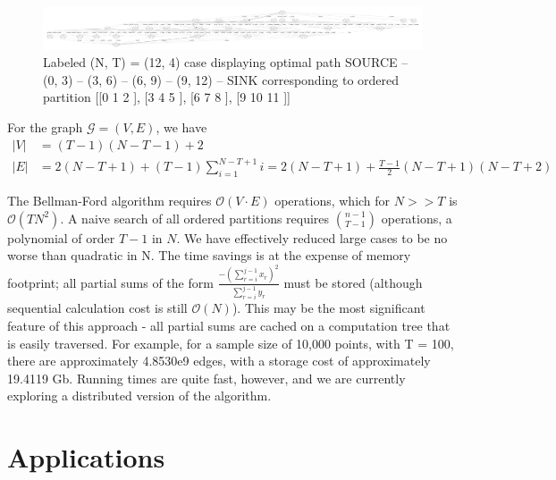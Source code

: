 \documentclass{article}
\theoremstyle{case}
\begin{document}
\vspace{16pt}
\begin{figure}
  \includegraphics[scale=.11]{12_4_labeled.pdf}
  \caption{Labeled (N, T) = (12, 4) case displaying optimal path SOURCE -- (0, 3) -- (3, 6) -- (6, 9) -- (9, 12) --  SINK corresponding to ordered partition [[0 1 2 ], [3 4 5 ], [6 7 8 ], [9 10 11 ]]}
\end{figure}

For the graph $\mathcal{G} = \left( V, E\right)$, we have 
\begin{align*}
\vert V \vert & = \left( T-1\right)\left(N-T-1\right) + 2 \\
\vert E \vert & = 2\left( N-T+1\right) + \left( T-1\right)\sum_{i=1}^{N-T+1} i = 2\left( N-T+1\right) + \frac{T-1}{2}\left( N-T+1\right)\left( N-T+2\right)
\end{align*}

The Bellman-Ford algorithm requires $\mathcal{O}\left( V\cdot E\right)$ operations, which for $N >> T$ is $\mathcal{O}\left( TN^2\right)$. A naive search of all ordered partitions requires $\binom{n-1}{T-1}$ operations, a polynomial of order $T-1$ in $N$. We have effectively reduced large cases to be no worse than quadratic in N. The time savings is at the expense of memory footprint; all partial sums of the form $\frac{-\left(\sum_{r=i}^{j-1} x_r\right)^2}{\sum_{r=i}^{j-1} y_r}$ must be stored (although sequential calculation cost is still $\mathcal{O}\left( N\right)$). This may be the most significant feature of this approach - all partial sums are cached on a computation tree that is easily traversed. For example, for a sample size of 10,000 points, with T = 100, there are approximately 4.8530e9 edges, with a storage cost of approximately 19.4119 Gb. Running times are quite fast, however, and we are currently exploring a distributed version of the algorithm.

\section{Applications}

\cleardoublepage
\appendix
\end{document}
